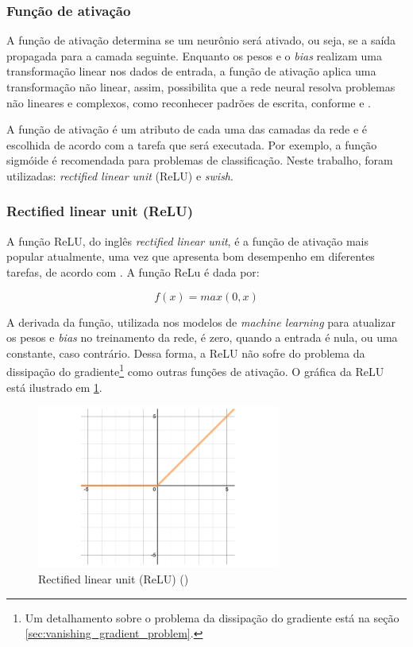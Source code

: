 \subsubsection{Função de ativação}
\label{sec:funcao_ativacao}

A função de ativação determina se um neurônio será ativado, ou seja, 
se a saída propagada para a camada seguinte. Enquanto os pesos 
e o \textit{bias} realizam uma transformação linear nos dados 
de entrada, a função de ativação aplica uma transformação não
linear, assim, possibilita que a rede neural resolva
problemas não lineares e complexos, como reconhecer padrões de 
escrita, conforme \cite{deeplearningbook} e \cite{zhang2021dive}. 

A função de ativação é um atributo de cada uma das camadas 
da rede e é escolhida de acordo com a tarefa que será 
executada. Por exemplo, a função sigmóide é recomendada
 para problemas de classificação. Neste trabalho, 
foram utilizadas: \textit{rectified linear unit} (ReLU) e \textit{swish}.

\subsubsection{Rectified linear unit (ReLU)}

A função ReLU, do inglês \textit{rectified linear unit}, é a
função de ativação mais popular atualmente, uma vez que apresenta bom desempenho 
em diferentes tarefas, de acordo com \cite{dl-oreilly}. A função ReLu é dada por:

\begin{equation}
  f(x) = max(0,x)
\end{equation}

A derivada da função, utilizada nos modelos de \textit{machine learning}
para atualizar os pesos e \textit{bias} no treinamento da rede, é zero, quando 
a entrada é nula, ou uma constante, caso contrário. Dessa
forma, a ReLU não sofre do problema da dissipação do gradiente\footnote{Um 
detalhamento sobre o problema da dissipação do gradiente está na seção \ref{sec:vanishing_gradient_problem}.} como
outras funções de ativação. O gráfica da ReLU está ilustrado em \ref{fig:relu}.

\begin{figure}[H] 
  \includegraphics[width= 8cm]{../figuras/relu.png}
  \caption{Rectified linear unit (ReLU) (\cite{dl-oreilly})}
  \label{fig:relu}
\end{figure}

